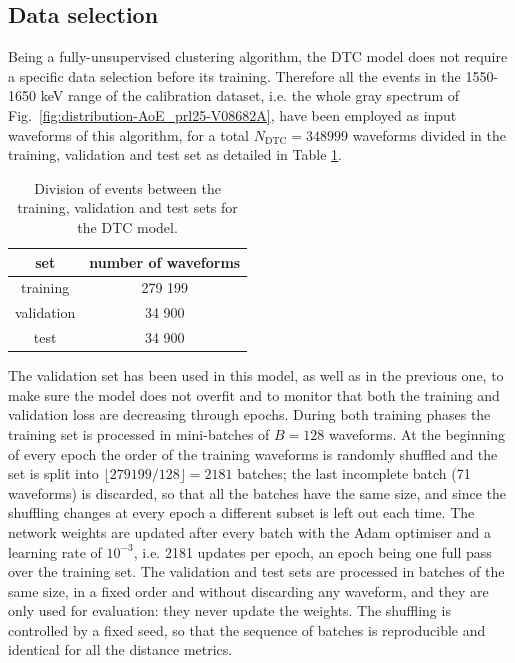 \subsection{Data selection}
\label{subsec:data-selection-DTC}
Being a fully-unsupervised clustering algorithm, the \ac{DTC} model does not require a specific data selection before its training. Therefore all the events in the 1550-1650 keV range of the calibration dataset, i.e. the whole gray spectrum of Fig.~\ref{fig:distribution-AoE_prl25-V08682A}, have been employed as input waveforms of this algorithm, for a total $N_\text{DTC} = 348 999$ waveforms divided in the training, validation and test set as detailed in Table \ref{tab:sets-DTC}.
\begin{table}[H]
    \centering
    \begin{tabular}{cc}
        \toprule
        set & number of waveforms\\
        \midrule
        training & 279 199 \\
        validation & 34 900 \\
        test & 34 900\\
        \bottomrule
    \end{tabular}
    \caption{Division of events between the training, validation and test sets for the \ac{DTC} model.}
    \label{tab:sets-DTC}
\end{table}

The validation set has been used in this model, as well as in the previous one, to make sure the model does not overfit and to monitor that both the training and validation loss are decreasing through epochs.
During both training phases the training set is processed in mini-batches of $B = 128$ waveforms. At the beginning of every epoch the order of the training waveforms is randomly shuffled and the set is split into $\lfloor 279 199 / 128 \rfloor = 2181$ batches; the last incomplete batch (71 waveforms) is discarded, so that all the batches have the same size, and since the shuffling changes at every epoch a different subset is left out each time. The network weights are updated after every batch with the Adam optimiser and a learning rate of $10^{-3}$, i.e. 2181 updates per epoch, an epoch being one full pass over the training set. The validation and test sets are processed in batches of the same size, in a fixed order and without discarding any waveform, and they are only used for evaluation: they never update the weights. The shuffling is controlled by a fixed seed, so that the sequence of batches is reproducible and identical for all the distance metrics.


